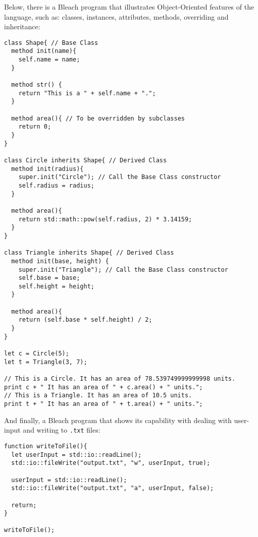 Below, there is a Bleach program that illustrates Object-Oriented features of the language, such as: classes, instances, attributes, methods, overriding and inheritance: \newline
\begin{lstlisting}
class Shape{ // Base Class
  method init(name){
    self.name = name;
  }

  method str() {
    return "This is a " + self.name + ".";
  }

  method area(){ // To be overridden by subclasses
    return 0;
  }
}

class Circle inherits Shape{ // Derived Class
  method init(radius){
    super.init("Circle"); // Call the Base Class constructor
    self.radius = radius;
  }

  method area(){
    return std::math::pow(self.radius, 2) * 3.14159;
  }
}

class Triangle inherits Shape{ // Derived Class
  method init(base, height) {
    super.init("Triangle"); // Call the Base Class constructor
    self.base = base;
    self.height = height;
  }

  method area(){
    return (self.base * self.height) / 2;
  }
}

let c = Circle(5);
let t = Triangle(3, 7);

// This is a Circle. It has an area of 78.539749999999998 units.
print c + " It has an area of " + c.area() + " units.";
// This is a Triangle. It has an area of 10.5 units.
print t + " It has an area of " + t.area() + " units.";
\end{lstlisting}

And finally, a Bleach program that shows its capability with dealing with user-input and writing to \texttt{.txt} files: \newline
\begin{lstlisting}
function writeToFile(){
  let userInput = std::io::readLine();
  std::io::fileWrite("output.txt", "w", userInput, true);

  userInput = std::io::readLine();
  std::io::fileWrite("output.txt", "a", userInput, false);

  return;
}

writeToFile();
\end{lstlisting}


